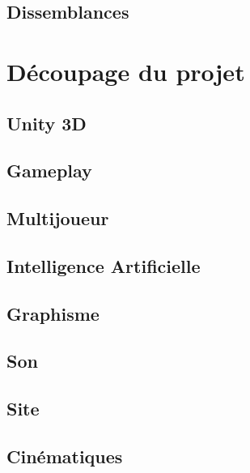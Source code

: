 \documentclass[10pt]{article} %
\begin{document}
\subsection{Dissemblances}



\section{Découpage du projet}



\subsection{Unity 3D}



\subsection{Gameplay}



\subsection{Multijoueur}



\subsection{Intelligence Artificielle}



\subsection{Graphisme}



\subsection{Son}



\subsection{Site}



\subsection{Cinématiques}
\end{document}
